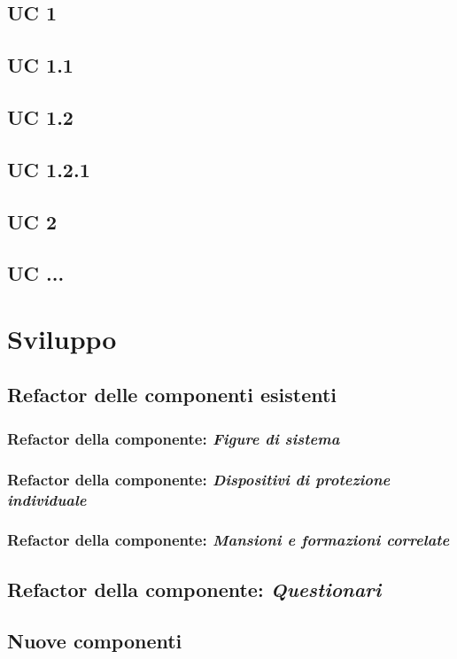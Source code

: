 	\subsection{UC 1}
	\subsection{UC 1.1}
	\subsection{UC 1.2}
	\subsection{UC 1.2.1}
	\subsection{UC 2}	
	\subsection{UC ...}

\section{Sviluppo}
\subsection{Refactor delle componenti esistenti}
	
\subsubsection{Refactor della componente: \textit{Figure di sistema}}
\subsubsection{Refactor della componente: \textit{Dispositivi di protezione individuale}}
\subsubsection{Refactor della componente: \textit{Mansioni e formazioni correlate}}
\subsection{Refactor della componente: \textit{Questionari}}


\subsection{Nuove componenti}
